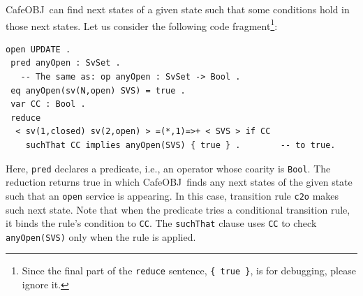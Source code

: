\documentclass[12pt]{report}
\newcommand{\stt}[1]{{\small{\tt {#1}}}}
\newcommand{\cafeobj}{{\sf CafeOBJ}~}
\begin{document}
\cafeobj can find next states of a given state such that some
conditions hold in those next states. Let us consider the following
code fragment\footnote{Since the final part of the {\tt reduce} sentence,
  {\tt \{~true~\}}, is for debugging, please ignore it.}:
\begin{verbatim}
open UPDATE .
 pred anyOpen : SvSet .
   -- The same as: op anyOpen : SvSet -> Bool .
 eq anyOpen(sv(N,open) SVS) = true .
 var CC : Bool .
 reduce 
  < sv(1,closed) sv(2,open) > =(*,1)=>+ < SVS > if CC
    suchThat CC implies anyOpen(SVS) { true } .        -- to true.
\end{verbatim}
Here, {\tt pred} declares a predicate, i.e., an operator whose coarity
is {\tt Bool}.  The reduction returns true in which \cafeobj finds any
next states of the given state such that an {\tt open} service is
appearing. In this case, transition rule {\tt c2o} makes such next
state.  Note that when the predicate tries a conditional transition
rule, it binds the rule's condition to {\tt CC}. The {\tt suchThat}
clause uses {\tt CC} to check \stt{anyOpen(SVS)} only when the rule is
applied.
\end{document}
